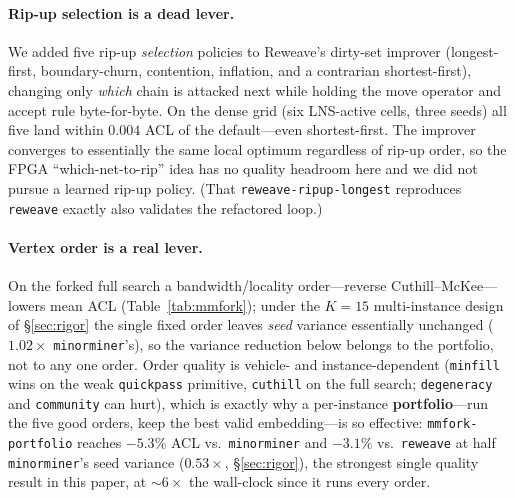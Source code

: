 \documentclass[acmsmall,anonymous,nonacm]{acmart}
\begin{document}
\paragraph{Rip-up selection is a dead lever.}
We added five rip-up \emph{selection} policies to Reweave's dirty-set improver
(longest-first, boundary-churn, contention, inflation, and a contrarian
shortest-first), changing only \emph{which} chain is attacked next while holding
the move operator and accept rule byte-for-byte. On the dense grid (six LNS-active
cells, three seeds) all five land within $0.004$ ACL of the default---even
shortest-first. The improver converges to essentially the same local optimum
regardless of rip-up order, so the FPGA ``which-net-to-rip'' idea has no quality
headroom here and we did not pursue a learned rip-up policy. (That
\texttt{reweave-ripup-longest} reproduces \texttt{reweave} exactly also validates
the refactored loop.)

\paragraph{Vertex order is a real lever.}
On the forked full search a bandwidth/locality order---reverse Cuthill--McKee---
lowers mean ACL (Table~\ref{tab:mmfork}); under the $K{=}15$ multi-instance design
of \S\ref{sec:rigor} the single fixed order leaves \emph{seed} variance essentially
unchanged ($1.02\times$ \texttt{minorminer}'s), so the variance reduction below
belongs to the portfolio, not to any one order. Order quality is vehicle- and
instance-dependent
(\texttt{minfill} wins on the weak \texttt{quickpass} primitive, \texttt{cuthill}
on the full search; \texttt{degeneracy} and \texttt{community} can hurt), which is
exactly why a per-instance \textbf{portfolio}---run the five good orders, keep the
best valid embedding---is so effective: \texttt{mmfork-portfolio} reaches $-5.3\%$
ACL vs.\ \texttt{minorminer} and $-3.1\%$ vs.\ \texttt{reweave} at half
\texttt{minorminer}'s seed variance ($0.53\times$, \S\ref{sec:rigor}), the
strongest single quality result in
this paper, at ${\sim}6\times$ the wall-clock since it runs every order.
\end{document}
